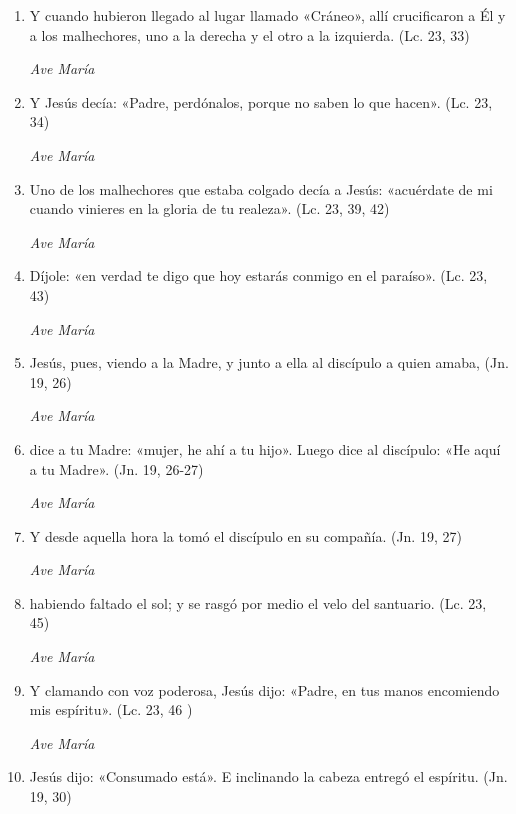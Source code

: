\documentclass[a4paper,11pt, oneside]{report}
\begin{document}
        \begin{enumerate}
          
          \item Y cuando hubieron llegado al lugar llamado «Cráneo», allí crucificaron a Él y a los malhechores, uno a la derecha y el otro a la izquierda. (Lc. 23, 33)

          \textit{Ave María}

          \item Y Jesús decía: «Padre, perdónalos, porque no saben lo que hacen». (Lc. 23, 34)

          \textit{Ave María}

          \item Uno de los malhechores que estaba colgado decía a Jesús: «acuérdate de mi cuando vinieres en la gloria de tu realeza». (Lc. 23, 39, 42)

          \textit{Ave María}

          \item Díjole: «en verdad te digo que hoy estarás conmigo en el paraíso». (Lc. 23, 43)

          \textit{Ave María}

          \item Jesús, pues, viendo a la Madre, y junto a ella al discípulo a quien amaba, (Jn. 19, 26)

          \textit{Ave María}

          \item dice a tu Madre: «mujer, he ahí a tu hijo». Luego dice al discípulo: «He aquí a tu Madre». (Jn. 19, 26-27)

          \textit{Ave María}

          \item Y desde aquella hora la tomó el discípulo en su compañía. (Jn. 19, 27)

          \textit{Ave María}

          \item habiendo faltado el sol; y se rasgó por medio el velo del santuario. (Lc. 23, 45)

          \textit{Ave María}

          \item Y clamando con voz poderosa, Jesús dijo: «Padre, en tus manos encomiendo mis espíritu». (Lc. 23, 46 )

          \textit{Ave María}

          \item Jesús dijo: «Consumado está». E inclinando la cabeza entregó el espíritu. (Jn. 19, 30)

        \end{enumerate}
\end{document}
